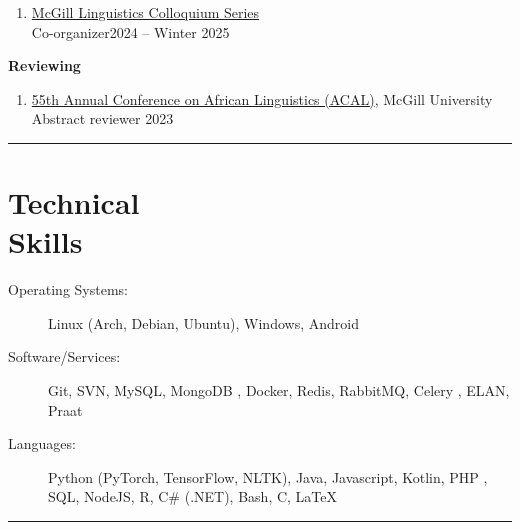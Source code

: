 \documentclass[margin,line]{resume}
\begin{document}
\begin{resume}
\begin{enumerate}[-, leftmargin=1em, topsep=4pt]
		\item[] \href{https://www.mcgill.ca/linguistics/events/colloquium-series}{McGill Linguistics Colloquium Series}\\
		      \hphantom{...}Co-organizer\hfill 2024 -- Winter 2025
	\end{enumerate}

	\textbf{Reviewing}
	\begin{enumerate}[-, leftmargin=1em, topsep=4pt]
		\item[]  \href{https://acal55.mull-lab.org/}{55th Annual Conference on African Linguistics (ACAL)}, McGill University\\
		      \hphantom{...}Abstract reviewer \hfill 2023
	\end{enumerate}

	\vspace{-0.9em}\rule{\textwidth}{0.4pt}


	\section{\mysidestyle Technical\\Skills}\vspace{2mm}
	\begin{description}
		\item[Operating Systems:] Linux (Arch, Debian, Ubuntu), Windows, Android
		\item[Software/Services:] Git, SVN, MySQL, MongoDB%
		      , Docker, Redis, RabbitMQ, Celery%
		      , ELAN, Praat%
		\item[Languages:] Python (PyTorch, TensorFlow, NLTK),
		      Java, Javascript, Kotlin, PHP%
		      , SQL, NodeJS, R, C\# (.NET),
		      Bash, C, \LaTeX
	\end{description}

	\vspace{-1.1em}\rule{\textwidth}{0.4pt}




\end{resume}
\end{document}
